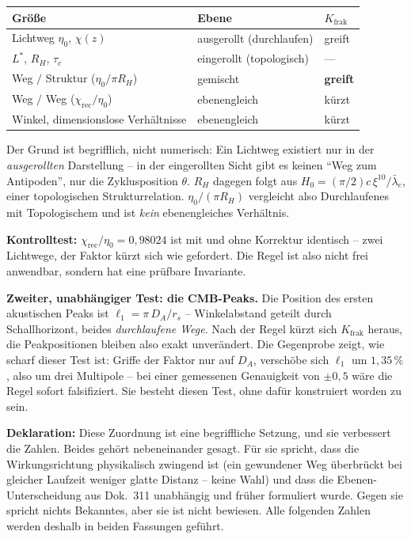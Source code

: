 \begin{center}
\begin{tabular}{lll}
\toprule
Größe & Ebene & $K_\text{frak}$ \\
\midrule
Lichtweg $\eta_0$, $\chi(z)$ & ausgerollt (durchlaufen) & greift \\
$L^{*}$, $R_H$, $\tau_c$ & eingerollt (topologisch) & --- \\
Weg $/$ Struktur ($\eta_0/\pi R_H$) & gemischt & \textbf{greift} \\
Weg $/$ Weg ($\chi_\text{rec}/\eta_0$) & ebenengleich & kürzt \\
Winkel, dimensionslose Verhältnisse & ebenengleich & kürzt \\
\bottomrule
\end{tabular}
\end{center}

Der Grund ist begrifflich, nicht numerisch: Ein Lichtweg existiert
nur in der \emph{ausgerollten} Darstellung -- in der eingerollten
Sicht gibt es keinen \enquote{Weg zum Antipoden}, nur die
Zyklusposition $\theta$. $R_H$ dagegen folgt aus
$H_0 = (\pi/2)c\,\xi^{10}/\bar\lambda_e$, einer topologischen
Strukturrelation. $\eta_0/(\pi R_H)$ vergleicht also Durchlaufenes
mit Topologischem und ist \emph{kein} ebenengleiches Verhältnis.

\textbf{Kontrolltest:} $\chi_\text{rec}/\eta_0 = 0{,}98024$ ist
mit und ohne Korrektur identisch -- zwei Lichtwege, der Faktor
kürzt sich wie gefordert. Die Regel ist also nicht frei
anwendbar, sondern hat eine prüfbare Invariante.

\textbf{Zweiter, unabhängiger Test: die CMB-Peaks.} Die Position
des ersten akustischen Peaks ist
$\ell_1 = \pi\,D_A/r_s$ -- Winkelabstand geteilt durch
Schallhorizont, beides \emph{durchlaufene Wege}. Nach der Regel
kürzt sich $K_\text{frak}$ heraus, die Peakpositionen bleiben also
exakt unverändert. Die Gegenprobe zeigt, wie scharf dieser Test
ist: Griffe der Faktor nur auf $D_A$, verschöbe sich $\ell_1$ um
$1{,}35\,\%$, also um drei Multipole -- bei einer gemessenen
Genauigkeit von $\pm0{,}5$ wäre die Regel sofort falsifiziert.
Sie besteht diesen Test, ohne dafür konstruiert worden zu sein.

\textbf{Deklaration:} Diese Zuordnung ist eine begriffliche
Setzung, und sie verbessert die Zahlen. Beides gehört
nebeneinander gesagt. Für sie spricht, dass die Wirkungsrichtung
physikalisch zwingend ist (ein gewundener Weg überbrückt bei
gleicher Laufzeit weniger glatte Distanz -- keine Wahl) und dass
die Ebenen-Unterscheidung aus Dok.~311 unabhängig und früher
formuliert wurde. Gegen sie spricht nichts Bekanntes, aber sie ist
nicht bewiesen. Alle folgenden Zahlen werden deshalb in beiden
Fassungen geführt.

